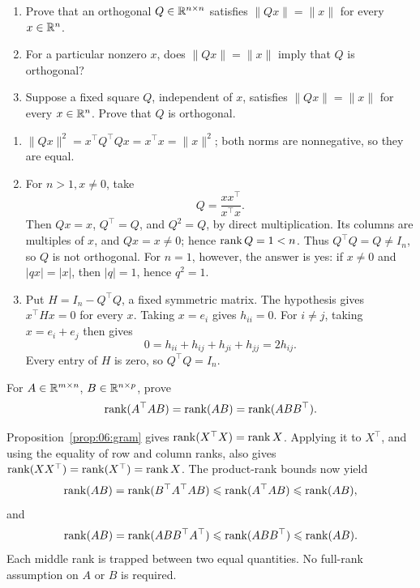 \begin{problem}\label{ex:06:norm-preservation}
\begin{enumerate}
\item Prove that an orthogonal \(Q\in\mathbb R^{n\times n}\) satisfies
\(\|Qx\|=\|x\|\) for every \(x\in\mathbb R^n\).
\item For a particular nonzero \(x\), does \(\|Qx\|=\|x\|\) imply
that \(Q\) is orthogonal?
\item Suppose a fixed square \(Q\), independent of \(x\), satisfies
\(\|Qx\|=\|x\|\) for every \(x\in\mathbb R^n\). Prove that \(Q\) is orthogonal.
\end{enumerate}
\end{problem}
\begin{solution}
\begin{enumerate}
\item \(\|Qx\|^2=x^\top Q^\top Qx=x^\top x=\|x\|^2\);
both norms are nonnegative, so they are equal.
\item For \(n>1,x\ne0\), take
\[
Q=\frac{xx^\top}{x^\top x}.
\]
Then \(Qx=x\), \(Q^\top=Q\), and \(Q^2=Q\), by direct multiplication.
Its columns are multiples of \(x\), and \(Qx=x\ne0\); hence \(\operatorname{rank} Q=1<n\).
Thus \(Q^\top Q=Q\ne I_n\), so \(Q\) is not orthogonal.
For \(n=1\), however, the answer is yes: if \(x\ne0\) and
\(|qx|=|x|\), then \(|q|=1\), hence \(q^2=1\).
\item Put \(H=I_n-Q^\top Q\), a fixed symmetric matrix.
The hypothesis gives \(x^\top Hx=0\) for every \(x\).
Taking \(x=e_i\) gives \(h_{ii}=0\).
For \(i\ne j\), taking \(x=e_i+e_j\) then gives
\[
0=h_{ii}+h_{ij}+h_{ji}+h_{jj}=2h_{ij}.
\]
Every entry of \(H\) is zero, so \(Q^\top Q=I_n\).
\end{enumerate}
\end{solution}

\begin{problem}\label{ex:06:rank-equalities}
For \(A\in\mathbb R^{m\times n}\), \(B\in\mathbb R^{n\times p}\), prove
\[
\operatorname{rank}(A^\top AB)=\operatorname{rank}(AB)=\operatorname{rank}(ABB^\top).
\]
\end{problem}
\begin{solution}
Proposition~\ref{prop:06:gram} gives \(\operatorname{rank}(X^\top X)=\operatorname{rank} X\).
Applying it to \(X^\top\), and using the equality of row and column
ranks, also gives
\(\operatorname{rank}(XX^\top)=\operatorname{rank}(X^\top)=\operatorname{rank} X\).
The product-rank bounds now yield
\[
\operatorname{rank}(AB)
=\operatorname{rank}(B^\top A^\top AB)
\leqslant\operatorname{rank}(A^\top AB)
\leqslant\operatorname{rank}(AB),
\]
and
\[
\operatorname{rank}(AB)
=\operatorname{rank}(ABB^\top A^\top)
\leqslant\operatorname{rank}(ABB^\top)
\leqslant\operatorname{rank}(AB).
\]
Each middle rank is trapped between two equal quantities.
No full-rank assumption on \(A\) or \(B\) is required.
\end{solution}

